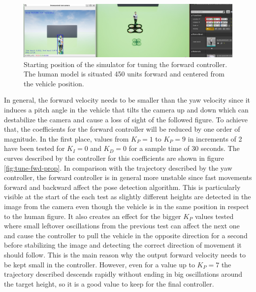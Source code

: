 

\begin{figure}
  \centering
  \includegraphics[width=\textwidth, keepaspectratio]{img/pid/tune-ref-pos-fwd.jpg}
  \caption{Starting position of the simulator for tuning the forward controller. The human model is situated 450 units forward and centered from the vehicle position.}\label{fig:tune-ref-pos-fwd}
\end{figure}

In general, the forward velocity needs to be smaller than the yaw velocity since it induces a pitch angle in the vehicle that tilts the camera up and down which can destabilize the camera and cause a loss of sight of the followed figure.
To achieve that, the coefficients for the forward controller will be reduced by one order of magnitude.
In the first place, values from $K_P=1$ to $K_P=9$ in increments of 2 have been tested for $K_I=0$ and $K_D=0$ for a sample time of 30 seconds.
The curves described by the controller for this coefficients are shown in figure \ref{fig:tune-fwd-prop}.
In comparison with the trajectory described by the yaw controller, the forward controller is in general more unstable since fast movements forward and backward affect the pose detection algorithm.
This is particularly visible at the start of the each test as slightly different heights are detected in the image from the camera even though the vehicle is in the same position in respect to the human figure.
It also creates an effect for the bigger $K_P$ values tested where small leftover oscillations from the previous test can affect the next one and cause the controller to pull the vehicle in the opposite direction for a second before stabilizing the image and detecting the correct direction of movement it should follow.
This is the main reason why the output forward velocity needs to be kept small in the controller.
However, even for a value up to $K_P=7$ the trajectory described descends rapidly without ending in big oscillations around the target height, so it is a good value to keep for the final controller.



